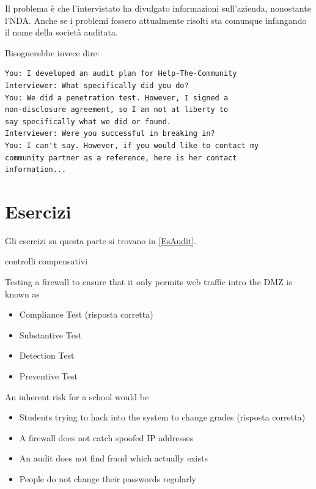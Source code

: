 Il problema è che l'intervistato ha divulgato informazioni sull'azienda,
nonostante l'NDA. Anche se i problemi fossero attualmente risolti sta comunque
infangando il nome della società auditata.


Bisognerebbe invece dire:
\begin{verbatim}
You: I developed an audit plan for Help-The-Community
Interviewer: What specifically did you do?
You: We did a penetration test. However, I signed a
non-disclosure agreement, so I am not at liberty to
say specifically what we did or found.
Interviewer: Were you successful in breaking in?
You: I can't say. However, if you would like to contact my
community partner as a reference, here is her contact
information...
\end{verbatim}

\section{Esercizi}
Gli esercizi su questa parte si trovano in \ref{EsAudit}.















controlli compensativi


Testing a firewall to ensure that it only permits web traffic intro the DMZ is
known as

\begin{itemize}
\item Compliance Test (risposta corretta)
\item Substantive Test
\item Detection Test
\item Preventive Test
\end{itemize}


An inherent risk for a school would be

\begin{itemize}
\item Students trying to hack into the system to change grades (risposta
corretta)
\item A firewall does not catch spoofed IP addresses
\item An audit does not find fraud which actually exists
\item People do not change their passwords regularly
\end{itemize}
